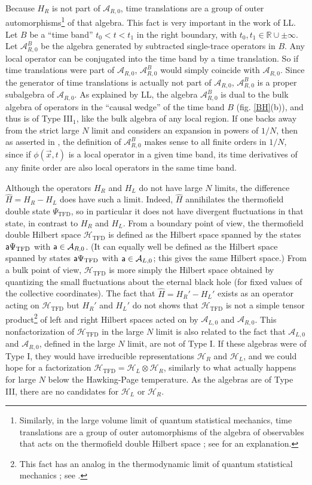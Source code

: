 \documentclass[11pt,a4paper]{article}
\def\a{{\sf a}}
\def\h{\widehat}
\def\A{{\mathcal A}}
\def\R{{\mathbb R}}
\def\h{\widehat}
\def\H{{\mathcal H}}
\def\TFD{{\mathrm{TFD}}}
\begin{document}
Because $H_R$ is not part of $\A_{R,0}$, time translations are a group of outer automorphisms\footnote{Similarly, in the large volume limit of quantum
statistical mechanics, time translations are a group of outer automorphisms of the algebra of observables that acts on the thermofield double Hilbert space
\cite{HHW}; see \cite{Lecture} for an explanation.}
of that algebra.  This fact is very important in the work of LL.  Let 
$B$ be a ``time band'' $t_0<t<t_1$ in the right boundary, 
with $t_0,t_1\in \R\cup\pm\infty$.   Let $\A_{R,0}^B$ be the algebra generated by subtracted single-trace operators in $B$.
Any local operator can be conjugated into the time band by a time translation.   So if time translations were part of $\A_{R,0}$,
$\A_{R,0}^B$ would simply coincide with $\A_{R,0}$.  Since the generator of time translations is actually not part of $\A_{R,0}$, $\A_{R,0}^B$ is a proper subalgebra of $\A_{R,0}$.
 As explained by LL, the algebra $\A_{R,0}^B$ is dual to the bulk algebra of operators in the ``causal wedge'' of
the time band $B$ (fig. \ref{BH}(b)), and thus is of Type III$_1$, like the bulk algebra of any local region. 
  If one backs away from the strict large $N$ limit and considers an expansion in powers of $1/N$, then as asserted in \cite{LL,LL2}, the definition
of $\A_{R,0}^B$ makes sense to all finite orders in $1/N$, since if $\phi(\vec x,t)$ is a local operator in a given time band, its time derivatives of any finite order
are also local operators in the same time band.    

Although the operators $H_R$ and $H_L$ do not have large $N$ limits, the difference $\h H=H_R-H_L$ does have such a limit.   Indeed, $\h H$ annihilates
the thermofield double state $\Psi_\TFD$, so in particular it does not have  divergent fluctuations in that state, in contrast to $H_R$ and $H_L$.   From a boundary point of view, the thermofield double Hilbert space $\H_\TFD$ is defined as the Hilbert space spanned by  the states  $\a\Psi_\TFD$ with
$\a\in \A_{R,0}$. (It can equally well be defined as the Hilbert space spanned  by states $\a\Psi_\TFD$ with $\a\in\A_{L,0}$; this gives the same Hilbert space.) 
From a bulk point of view, $\H_\TFD$ is more simply the Hilbert space obtained by quantizing the small fluctuations about the eternal black hole
(for fixed values of the collective coordinates).
The fact that $\h H=H_R'-H_L'$ exists as an operator acting on $\H_\TFD$ but $H_R'$ and $H_L'$ do not shows that $\H_\TFD$ is not a simple tensor 
product\footnote{This fact has an analog in
the thermodynamic limit of quantum statistical mechanics \cite{HHW}; see \cite{Lecture}.} of left and right Hilbert spaces acted on by $\A_{L,0}$ and $\A_{R,0}$.  This nonfactorization
of $\H_\TFD$ in the large $N$ limit is also related to the  fact that $\A_{L,0}$ and $\A_{R,0}$, defined in the large $N$ limit, are not of Type I.   If these algebras were of
Type I, they would have irreducible representations $\H_R$ and $\H_L$, and we  could hope for a factorization $\H_\TFD=\H_L\otimes \H_R$, similarly
to what actually happens for large $N$ below the Hawking-Page temperature.   As the algebras are of Type III, there are no candidates for $\H_L$ or $\H_R$.
\end{document}
